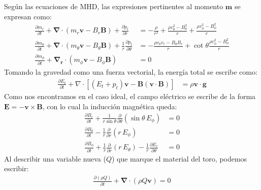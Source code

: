 \documentclass[11pt, letterpaper]{article}
\begin{document}
Según las ecuaciones de MHD, las expresiones pertinentes al momento $\mathbf{m}$ se expresan como:\cite{plutomanual}
\begin{subequations}\label{eq:momento_2D_esferico}
    \begin{align}
         \frac{\partial m_r}{\partial t} + \mathbf{\nabla \cdot} (m_r \mathbf{v} - B_r \mathbf{B}) + \frac{\partial p_t}{\partial r} &= -\frac{\rho}{r^2} + \frac{\rho v_\theta ^2 - B_\theta ^2}{r} + \frac{\rho v_\phi ^2 - B_\phi ^2}{r} \\[7pt]
         \frac{\partial m_\theta}{\partial t} + \mathbf{\nabla \cdot} (m_\theta \mathbf{v} - B_\theta \mathbf{B}) + \frac{1}{r}\frac{\partial p_t}{\partial \theta} &= - \frac{\rho v_\theta v_r - B_\theta B_r}{r} + \cot{\theta} \frac{\rho v_\phi ^2 - B_\phi ^2}{r} \\[7pt]
         \frac{\partial m_\phi}{\partial t} + \mathbf{\nabla_r \cdot} (m_\phi \mathbf{v} - B_\phi \mathbf{B}) &= 0
    \end{align}
\end{subequations}
Tomando la gravedad como una fuerza vectorial, la energía total se escribe como:
\begin{align}\label{eq:en_total}
    \frac{\partial E_t}{\partial t} + \nabla \cdot [(E_t + p_t)\mathbf{v} - \mathbf{B}(\mathbf{v \cdot B})] &= \rho \mathbf{v \cdot g}
\end{align}
Como nos encontramos en el caso ideal, el campo eléctrico se escribe de la forma $\mathbf{E = - v \times B}$, con lo cual la inducción magnética queda:
\begin{subequations}\label{eq:B_eqs}
    \begin{align}
        \frac{\partial B_r}{\partial t} + \frac{1}{r \sin\theta} \frac{\partial}{\partial \theta}(\sin\theta \, E_\phi) &= 0\\[5pt]
        \frac{\partial B_\theta}{\partial t} - \frac{1}{r} \frac{\partial}{\partial r}(r \, E_\phi) &= 0\\[5pt]
        \frac{\partial B_\phi}{\partial t} + \frac{1}{r} \frac{\partial}{\partial r}(r \, E_\theta) - \frac{1}{r} \frac{\partial E_r}{\partial \theta} &= 0
    \end{align}
\end{subequations}
Al describir una variable nueva ($Q$) que marque el material del toro, podemos escribir:
\begin{align}\label{eq:tr1}
    \frac{\partial (\rho Q)}{\partial t} + \mathbf{\nabla \cdot} (\rho Q \mathbf{v}) = 0
\end{align}
\end{document}
